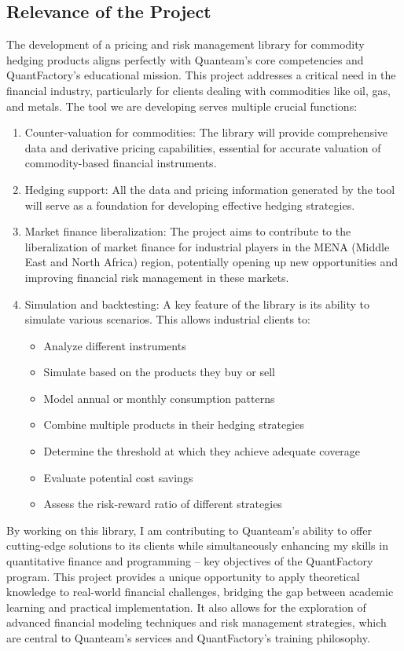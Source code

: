 \documentclass[12pt]{article}
\begin{document}
\subsection{Relevance of the Project}
The development of a pricing and risk management library for commodity hedging products aligns perfectly with Quanteam's core competencies and QuantFactory's educational mission. This project addresses a critical need in the financial industry, particularly for clients dealing with commodities like oil, gas, and metals. The tool we are developing serves multiple crucial functions:
\begin{enumerate}
\item Counter-valuation for commodities: The library will provide comprehensive data and derivative pricing capabilities, essential for accurate valuation of commodity-based financial instruments.
\item Hedging support: All the data and pricing information generated by the tool will serve as a foundation for developing effective hedging strategies.
\item Market finance liberalization: The project aims to contribute to the liberalization of market finance for industrial players in the MENA (Middle East and North Africa) region, potentially opening up new opportunities and improving financial risk management in these markets.
\item Simulation and backtesting: A key feature of the library is its ability to simulate various scenarios. This allows industrial clients to:
\begin{itemize}
\item Analyze different instruments
\item Simulate based on the products they buy or sell
\item Model annual or monthly consumption patterns
\item Combine multiple products in their hedging strategies
\item Determine the threshold at which they achieve adequate coverage
\item Evaluate potential cost savings
\item Assess the risk-reward ratio of different strategies
\end{itemize}
\end{enumerate}
By working on this library, I am contributing to Quanteam's ability to offer cutting-edge solutions to its clients while simultaneously enhancing my skills in quantitative finance and programming – key objectives of the QuantFactory program. This project provides a unique opportunity to apply theoretical knowledge to real-world financial challenges, bridging the gap between academic learning and practical implementation. It also allows for the exploration of advanced financial modeling techniques and risk management strategies, which are central to Quanteam's services and QuantFactory's training philosophy.\\\par
\end{document}

